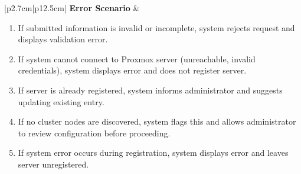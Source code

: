 \begin{table}[H]
\begin{tabular}{|p{2.7cm}|p{12.5cm}|}
        \textbf{Error Scenario} & \begin{minipage}[t]{\linewidth}
                                      \begin{enumerate}[topsep=0pt,itemsep=1pt,parsep=0pt,partopsep=0pt]
                                          \item If submitted information is invalid or incomplete, system rejects request and displays validation error.
                                          \item If system cannot connect to Proxmox server (unreachable, invalid credentials), system displays error and does not register server.
                                          \item If server is already registered, system informs administrator and suggests updating existing entry.
                                          \item If no cluster nodes are discovered, system flags this and allows administrator to review configuration before proceeding.
                                          \item If system error occurs during registration, system displays error and leaves server unregistered.
                                      \end{enumerate}
                                  \end{minipage} \\ \hline
    \end{tabular}
    \label{tab:admin-register-proxmox}
\end{table}

